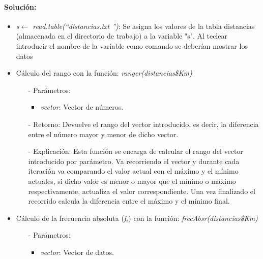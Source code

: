 \documentclass[a4paper, 12pt]{article}
\begin{document}
     \paragraph{Solución:}
        \begin{itemize}
            \item \emph{s$\leftarrow$ read.table(\textquotedblleft distancias.txt \textquotedblright)}: Se asigna los valores de la tabla distancias (almacenada en el directorio de trabajo) a la variable "s". Al teclear introducir el nombre de la variable como comando se deberían mostrar los datos
        
            \item Cálculo del rango con la función: \emph{ranger(distancias\$Km)}
            \begin{itemize}
                \item[-] Parámetros:
                \begin{itemize}
                    \item \emph{vector}: Vector de números.
                \end{itemize}

                \item[-]  Retorno: Devuelve el rango del vector introducido, es decir, la diferencia entre el número mayor y menor de dicho vector.
                
                \item[-] Explicación: Esta función se encarga de calcular el rango del vector introducido por parámetro. Va recorriendo el vector y durante cada iteración va comparando el valor actual con el máximo y el mínimo actuales, si dicho valor es menor o mayor que el mínimo o máximo respectivamente, actualiza el valor correspondiente. Una vez finalizado el recorrido calcula la diferencia entre el máximo y el mínimo final.
                \
            \end{itemize} 
        
            \item Cálculo de la frecuencia absoluta (\emph{f$_{i}$}) con la función: \emph{frecAbsr(distancias\$Km)}
            \begin{itemize}
                \item[-] Parámetros: 
                \begin{itemize}
                    \item \emph{vector}: Vector de datos.
                \end{itemize}


\end{itemize}
\end{itemize}
\end{document}
